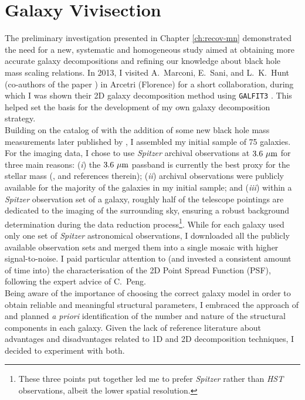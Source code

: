 \chapter{Galaxy Vivisection}
\label{ch:galviv}

The preliminary investigation presented in Chapter \ref{ch:recov-mn} \citep{savorgnan2013} 
demonstrated the need for a new, systematic and homogeneous study 
aimed at obtaining more accurate galaxy decompositions 
and refining our knowledge about black hole mass scaling relations. 
In 2013, I visited A.~Marconi, E.~Sani, and L.~K.~Hunt (co-authors of the paper \citealt{sani2011}) 
in Arcetri (Florence) for a short collaboration, 
during which I was shown their 2D galaxy decomposition method using {\tt GALFIT3} \citep{peng2010}. 
This helped set the basis for the development of my own galaxy decomposition strategy. \\

Building on the catalog of \cite{grahamscott2013} 
with the addition of some new black hole mass measurements later published by \cite{rusli2013bhmassesDM}, 
I assembled my initial sample of 75 galaxies. 
For the imaging data, 
I chose to use \emph{Spitzer} archival observations at $3.6~\mu \rm m$ for three main reasons: 
(\emph{i}) the $3.6~\mu \rm m$ passband is currently the best proxy for the stellar mass 
(\citealt{sheth2010}, and references therein); 
(\emph{ii}) archival observations were publicly available for the majority of the galaxies in my initial sample; 
and (\emph{iii}) within a \emph{Spitzer} observation set of a galaxy, 
roughly half of the telescope pointings are dedicated to the imaging of the surrounding sky, 
ensuring a robust background determination during the data reduction process\footnote{These three points put together 
led me to prefer \emph{Spitzer} rather than \emph{HST} observations, 
albeit the lower spatial resolution. }. 
While for each galaxy \cite{sani2011} used only one set of \emph{Spitzer} astronomical observations, 
I downloaded all the publicly available observation sets and merged them into a single mosaic with higher signal-to-noise. 
I paid particular attention to (and invested a consistent amount of time into) the characterisation of the 
2D Point Spread Function (PSF), following the expert advice of C.~Peng. \\

Being aware of the importance of choosing the correct galaxy model 
in order to obtain reliable and meaningful structural parameters, 
I embraced the approach of \cite{laurikainen2005} 
and planned \emph{a priori} identification of the number and nature of the structural components in each galaxy. 
Given the lack of reference literature about advantages and disadvantages 
related to 1D and 2D decomposition techniques, 
I decided to experiment with both. \\ 

